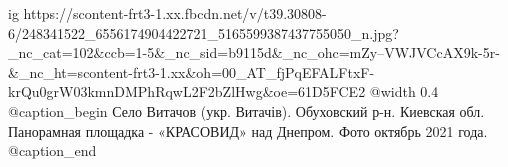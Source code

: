  
 
 
 
 

\ifcmt
  ig https://scontent-frt3-1.xx.fbcdn.net/v/t39.30808-6/248341522_6556174904422721_5165599387437755050_n.jpg?_nc_cat=102&ccb=1-5&_nc_sid=b9115d&_nc_ohc=mZy--VWJVCcAX9k-5r-&_nc_ht=scontent-frt3-1.xx&oh=00_AT_fjPqEFALFtxF-krQu0grW03kmnDMPhRqwL2F2bZlHwg&oe=61D5FCE2
  @width 0.4
  @caption_begin
    Село Витачов (укр. Витачів). Обуховский р-н. Киевская обл. 
    Панорамная площадка - «КРАСОВИД» над Днепром. Фото октябрь 2021 года.
  @caption_end
\fi
